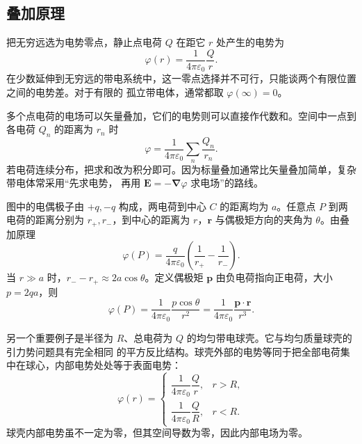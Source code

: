 \subsection{叠加原理}


把无穷远选为电势零点，静止点电荷 $Q$ 在距它 $r$ 处产生的电势为
\begin{equation}
  \boxed{\varphi(r)=\frac{1}{4\pi\varepsilon_0}\frac{Q}{r}}.
\end{equation}
在少数延伸到无穷远的带电系统中，这一零点选择并不可行，只能谈两个有限位置之间的电势差。对于有限的
孤立带电体，通常都取 $\varphi(\infty)=0$。

多个点电荷的电场可以矢量叠加，它们的电势则可以直接作代数和。空间中一点到各电荷 $Q_n$ 的距离为
$r_n$ 时
\begin{equation}
  \boxed{\varphi=\frac{1}{4\pi\varepsilon_0}
  \sum_n\frac{Q_n}{r_n}}.
\end{equation}
若电荷连续分布，把求和改为积分即可。因为标量叠加通常比矢量叠加简单，复杂带电体常采用“先求电势，
再用 $\boldsymbol E=-\boldsymbol\nabla\varphi$ 求电场”的路线。

图中的电偶极子由 $+q,-q$ 构成，两电荷到中心 $C$ 的距离均为 $a$。任意点 $P$ 到两电荷的距离分别为
$r_+,r_-$，到中心的距离为 $r$，$\boldsymbol r$ 与偶极矩方向的夹角为 $\theta$。由叠加原理
\[
  \varphi(P)=\frac{q}{4\pi\varepsilon_0}
  \left(\frac1{r_+}-\frac1{r_-}\right).
\]
当 $r\gg a$ 时，$r_- -r_+\approx2a\cos\theta$。定义偶极矩
$\boldsymbol p$ 由负电荷指向正电荷，大小 $p=2qa$，则
\begin{equation}
  \boxed{\varphi(P)=\frac{1}{4\pi\varepsilon_0}
  \frac{p\cos\theta}{r^2}
  =\frac{1}{4\pi\varepsilon_0}\frac{\boldsymbol p\cdot\boldsymbol r}{r^3}}.
\end{equation}

\par\noindent\begin{minipage}{\linewidth}
\dipolePotentialGeometry
{}
\end{minipage}\par\medskip

另一个重要例子是半径为 $R$、总电荷为 $Q$ 的均匀带电球壳。它与均匀质量球壳的引力势问题具有完全相同
的平方反比结构。球壳外部的电势等同于把全部电荷集中在球心，内部电势处处等于表面电势：
\begin{equation}
  \boxed{\varphi(r)=
  \begin{cases}
    \dfrac{1}{4\pi\varepsilon_0}\dfrac{Q}{r},&r>R,\\[6pt]
    \dfrac{1}{4\pi\varepsilon_0}\dfrac{Q}{R},&r<R.
  \end{cases}}
\end{equation}
球壳内部电势虽不一定为零，但其空间导数为零，因此内部电场为零。


